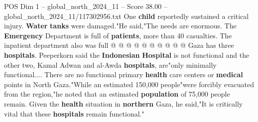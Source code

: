 \begin{textsample}{POS Dim 1 – global\_north\_2024\_11 – Score 38.00 – global\_north\_2024\_11/117302956.txt}
One \textbf{child} reportedly sustained a critical injury. \textbf{Water} \textbf{tanks} were damaged."He said,"The needs are enormous.
The \textbf{Emergency} Department is full of \textbf{patients}, more than 40 casualties.
The inpatient department also was full @ @ @ @ @ @ @ @ @ @ Gaza has three \textbf{hospitals}.
Peeperkorn said the \textbf{Indonesian} \textbf{Hospital} is not functional and the other two, Kamal Adwan and al-Awda \textbf{hospitals}, are"only minimally functional....
There are no functional primary \textbf{health} care centers or \textbf{medical} points in North Gaza."While an estimated 150,000 people"were forcibly evacuated from the region,"he noted that an estimated \textbf{population} of 75,000 people remain.
Given the \textbf{health} situation in \textbf{northern} Gaza, he said,"It is critically vital that these \textbf{hospitals} remain functional."

\end{textsample}
